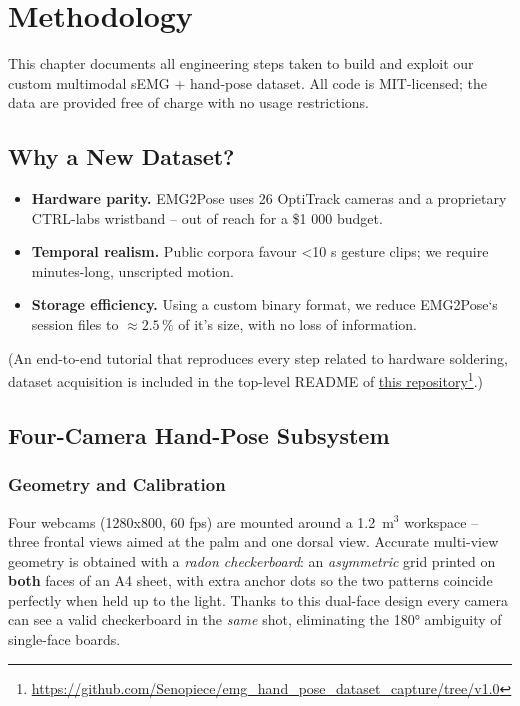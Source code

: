 \chapter{Methodology}
\label{chap:met}

This chapter documents all engineering steps taken to build and exploit our
custom multimodal sEMG + hand-pose dataset. All code is MIT-licensed; the data
are provided free of charge with no usage restrictions.

\section{Why a New Dataset?}

\begin{itemize}
  \item \textbf{Hardware parity.} EMG2Pose uses 26 OptiTrack cameras and a
        proprietary CTRL-labs wristband -- out of reach for a \$1 000 budget.
  \item \textbf{Temporal realism.} Public corpora favour <10 s gesture clips;
        we require minutes-long, unscripted motion.
  \item \textbf{Storage efficiency.} Using a custom binary format, we
        reduce EMG2Pose`s session files to $\approx2.5\,\%$ of it's size, with no loss of
        information.
\end{itemize}

(An end-to-end tutorial that reproduces every step related to hardware soldering, dataset acquisition is included in the top-level README of \href{https://github.com/Senopiece/emg_hand_pose_dataset_capture/tree/v1.0}{this repository}\footnote{\url{https://github.com/Senopiece/emg_hand_pose_dataset_capture/tree/v1.0}}.)

\section{Four-Camera Hand-Pose Subsystem}

\subsection{Geometry and Calibration}

Four webcams (1280x800, 60 fps) are mounted around a
\SI{1.2}{\metre}$^{3}$ workspace -- three frontal views aimed at the palm and one
dorsal view. Accurate multi-view geometry is obtained with a \textit{radon
checkerboard}: an \emph{asymmetric} grid printed on \textbf{both} faces of an
A4 sheet, with extra anchor dots so the two patterns coincide perfectly when
held up to the light. Thanks to this dual-face design every camera can see a
valid checkerboard in the \emph{same} shot, eliminating the 180° ambiguity of
single-face boards.

